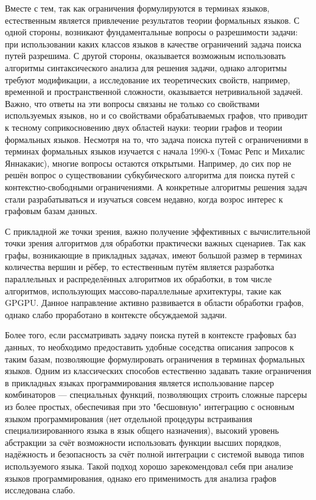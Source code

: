 \documentclass[12pt]{article}  %
\theoremstyle{remark}
\begin{document}
Вместе с тем, так как ограничения формулируются в терминах языков, естественным является привлечение результатов теории формальных языков.
С одной стороны, возникают фундаментальные вопросы о разрешимости задачи: при использовании каких классов языков в качестве ограничений задача поиска путей разрешима.
С другой стороны, оказывается возможным использовать алгоритмы синтаксического анализа для решения задачи, однако алгоритмы требуют модификации, а исследование их теоретических свойств, например, временной и пространственной сложности, оказывается нетривиальной задачей.
Важно, что ответы на эти вопросы связаны не только со свойствами используемых языков, но и со свойствами обрабатываемых графов, что приводит к тесному соприкосновению двух областей науки: теории графов и теории формальных языков.
Несмотря на то, что задача поиска путей с ограничениями в терминах формальных языков изучается с начала 1990-х (Томас Репс и Михалис Яннакакис), многие вопросы остаются открытыми.
Например, до сих пор не решён вопрос о существовании субкубического алгоритма для поиска путей с контекстно-свободными ограничениями.
А конкретные алгоритмы решения задач стали разрабатываться и изучаться совсем недавно, когда возрос интерес к графовым базам данных.

С прикладной же точки зрения, важно получение эффективных с вычислительной точки зрения алгоритмов для обработки практически важных сценариев.
Так как графы, возникающие в прикладных задачах, имеют большой размер в терминах количества вершин и рёбер, то естественным путём является разработка параллельных и распределённых алгоритмов их обработки, в том числе алгоритмов, использующих массово-параллельные архитектуры, такие как GPGPU.
Данное направление активно развивается в области обработки графов, однако слабо проработано в контексте обсуждаемой задачи.

Более того, если рассматривать задачу поиска путей в контексте графовых баз данных, то необходимо предоставить удобные соседства описания запросов к таким базам, позволяющие формулировать ограничения в терминах формальных языков.
Одним из классических способов естественно задавать такие ограничения в прикладных языках программирования является использование парсер комбинаторов --- специальных функций, позволяющих строить сложные парсеры из более простых, обеспечивая при это "бесшовную" интеграцию с основным языком программирования (нет отдельной процедуры встраивания специализированного языка в язык общего назначения), высокий уровень абстракции за счёт возможности использовать функции высших порядков, надёжность и безопасность за счёт полной интеграции с системой вывода типов используемого языка.
Такой подход хорошо зарекомендовал себя при анализе языков программирования, однако его применимость для анализа графов исследована слабо.
\end{document}
